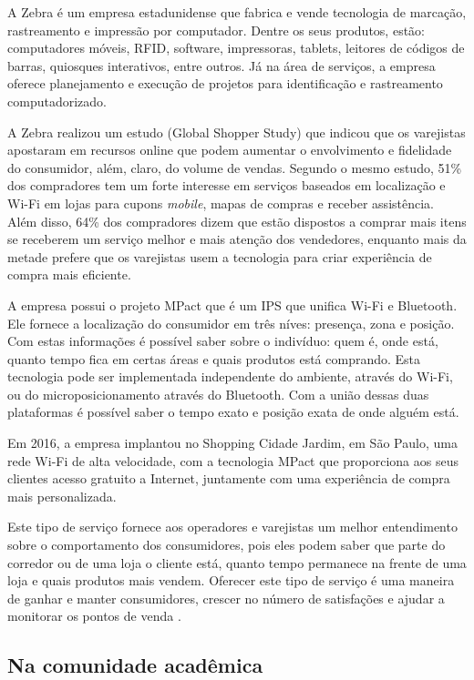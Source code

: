 A Zebra é um empresa estadunidense que fabrica e vende tecnologia de marcação,
rastreamento e impressão por computador. Dentre os seus produtos, estão:
computadores móveis, RFID, software, impressoras, tablets, leitores de códigos
de barras, quiosques interativos, entre outros. Já na área de serviços, a empresa
oferece planejamento e execução de projetos para identificação e rastreamento computadorizado.

A Zebra realizou um estudo (Global Shopper Study) que indicou que os varejistas
apostaram em recursos online que podem aumentar o envolvimento e fidelidade do
consumidor, além, claro, do volume de vendas. Segundo o mesmo estudo, 51\% dos
compradores tem um forte interesse em serviços baseados em localização e
Wi-Fi em lojas para cupons \emph{mobile}, mapas de compras e receber
assistência. Além disso, 64\% dos compradores dizem que estão dispostos a comprar
mais itens se receberem um serviço melhor e mais atenção dos vendedores,
enquanto mais da metade prefere que os varejistas usem a tecnologia para criar
experiência de compra mais eficiente.

A empresa possui o projeto MPact que é um IPS que unifica
Wi-Fi e Bluetooth. Ele fornece a localização do consumidor em três
níves: presença, zona e posição. Com estas informações é possível saber sobre o
indivíduo: quem é, onde está, quanto tempo fica em certas áreas e quais
produtos está comprando. Esta tecnologia pode ser implementada independente do
ambiente, através do Wi-Fi, ou do microposicionamento através do
Bluetooth. Com a união dessas duas plataformas é possível saber o tempo
exato e posição exata de onde alguém está.

Em 2016, a empresa implantou no Shopping Cidade Jardim, em São Paulo, uma rede
Wi-Fi de alta velocidade, com a tecnologia MPact que proporciona aos
seus clientes acesso gratuito a Internet, juntamente com uma experiência de
compra mais personalizada.

Este tipo de serviço fornece aos operadores
e varejistas um melhor entendimento sobre o comportamento dos consumidores, pois eles
podem saber que parte do corredor ou de uma loja o cliente está, quanto tempo
permanece na frente de uma loja e quais produtos mais vendem. Oferecer este tipo
de serviço é uma maneira de ganhar e manter consumidores, crescer no número de
satisfações e ajudar a monitorar os pontos de venda \cite{ZebraCidadeJardim}.

\subsection{Na comunidade acadêmica}
\label{subsec:Na comunidade acadêmica}

